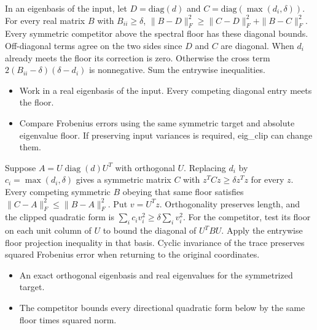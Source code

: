 \expandafter\def\csname statadic@statement@STATADIC-PSD-002\endcsname{In an eigenbasis of the input, let $D=\mathrm{diag}(d)$
  and $C=\mathrm{diag}(\max(d_i,\delta))$. For every real matrix $B$ with
  $B_{ii}\ge\delta$, $\|B-D\|_F^2\ge\|C-D\|_F^2+\|B-C\|_F^2$.
  Every symmetric competitor above the spectral floor has these diagonal bounds.}
\expandafter\def\csname statadic@proof@STATADIC-PSD-002\endcsname{Off-diagonal terms agree on the two sides since $D$ and $C$
  are diagonal. When $d_i$ already meets the floor its correction is zero.
  Otherwise the cross term $2(B_{ii}-\delta)(\delta-d_i)$ is nonnegative.
  Sum the entrywise inequalities.}
\expandafter\def\csname statadic@assumptions@STATADIC-PSD-002\endcsname{\begin{itemize}
\item Work in a real eigenbasis of the input. Every competing diagonal entry meets the floor.
\end{itemize}}
\expandafter\def\csname statadic@diagnostics@STATADIC-PSD-002\endcsname{\begin{itemize}
\item Compare Frobenius errors using the same symmetric target and absolute eigenvalue floor. If preserving input variances is required, eig\_clip can change them.
\end{itemize}}
\expandafter\def\csname statadic@statement@STATADIC-PSD-003\endcsname{Suppose $A=U\operatorname{diag}(d)U^T$ with orthogonal $U$.
  Replacing $d_i$ by $c_i=\max(d_i,\delta)$ gives a symmetric matrix $C$
  with $z^TCz\ge\delta z^Tz$ for every $z$. Every competing symmetric $B$
  obeying that same floor satisfies $\|C-A\|_F^2\le\|B-A\|_F^2$.}
\expandafter\def\csname statadic@proof@STATADIC-PSD-003\endcsname{Put $v=U^Tz$. Orthogonality preserves length, and the
  clipped quadratic form is $\sum_i c_i v_i^2\ge\delta\sum_i v_i^2$.
  For the competitor, test its floor on each unit column of $U$ to bound the
  diagonal of $U^TBU$. Apply the entrywise floor projection inequality in that
  basis. Cyclic invariance of the trace preserves squared Frobenius error
  when returning to the original coordinates.}
\expandafter\def\csname statadic@assumptions@STATADIC-PSD-003\endcsname{\begin{itemize}
\item An exact orthogonal eigenbasis and real eigenvalues for the symmetrized target.
\item The competitor bounds every directional quadratic form below by the same floor times squared norm.
\end{itemize}}
